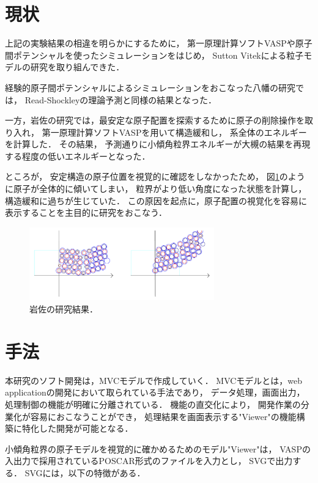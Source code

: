 \documentclass[a4j,twocolumn]{jsarticle}
\begin{document}
\section{現状}
上記の実験結果の相違を明らかにするために，
第一原理計算ソフトVASPや原子間ポテンシャルを使ったシミュレーションをはじめ，
Sutton Vitekによる粒子モデルの研究を取り組んできた．

経験的原子間ポテンシャルによるシミュレーションをおこなった八幡の研究では，
Read-Shockleyの理論予測と同様の結果となった\cite{yahata}．

一方，岩佐の研究では，最安定な原子配置を探索するために原子の削除操作を取り入れ，
第一原理計算ソフトVASPを用いて構造緩和し，
系全体のエネルギーを計算した．
その結果，
予測通りに小傾角粒界エネルギーが大槻の結果を再現する程度の低いエネルギーとなった\cite{iwasa}．

ところが，
安定構造の原子位置を視覚的に確認をしなかったため，
図\ref{fig:two}のように原子が全体的に傾いてしまい，
粒界がより低い角度になった状態を計算し，構造緩和に過ちが生じていた．
この原因を起点に，原子配置の視覚化を容易に表示することを主目的に研究をおこなう．
\begin{figure}[h]
\begin{center}
   \includegraphics[width=80mm]{./Iwasa.png} 
     \caption{岩佐の研究結果．}
  \label{fig:two}
\end{center}
\end{figure}



\section{手法}
本研究のソフト開発は，MVCモデルで作成していく．
MVCモデルとは，web applicationの開発において取られている手法であり，
データ処理，画面出力，処理制御の機能が明確に分離されている．
機能の直交化により，
開発作業の分業化が容易におこなうことができ， 
処理結果を画面表示する"Viewer"の機能構築に特化した開発が可能となる．

小傾角粒界の原子モデルを視覚的に確かめるためのモデル"Viewer"は，
VASPの入出力で採用されているPOSCAR形式のファイルを入力とし，
SVGで出力する．
SVGには，以下の特徴がある．
\end{document}
